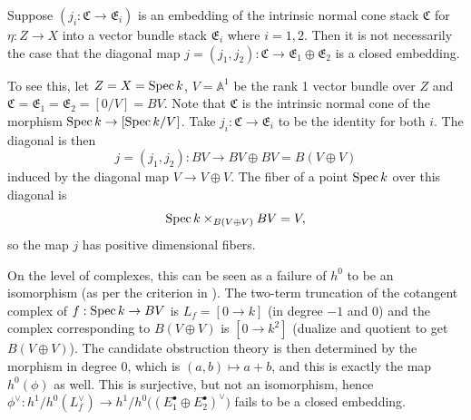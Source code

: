 \begin{example}\label{rl-0012}
  Suppose \((j_i:\mathfrak C\to \mathfrak E_i)\) is an embedding of the intrinsic normal cone stack \(\mathfrak C\) for \(\eta:Z\to X\) into a vector bundle stack \(\mathfrak E_i\) where \(i = 1,2\). Then it is not necessarily the case that the diagonal map \(j=(j_1,j_2):\mathfrak C\to \mathfrak E_1\oplus \mathfrak E_2\) is a closed embedding.

  To see this, let \(Z = X = \operatorname{Spec} k\), \(V = \mathbb A^1\) be the rank 1 vector bundle over \(Z\) and \(\mathfrak C = \mathfrak E_1 = \mathfrak E_2 = [0 / V] = BV\). Note that \(\mathfrak C\) is the intrinsic normal cone of the morphism \(\operatorname{Spec} k \to [\operatorname{Spec} k/V]\). Take \(j_i:\mathfrak C\to \mathfrak E_i\) to be the identity for both \(i\). The diagonal is then
  \[j = (j_1,j_2): BV \to BV \oplus BV = B(V\oplus V)\]
  induced by the diagonal map \(V\to V\oplus V\). The fiber of a point \(\operatorname{Spec} k\) over this diagonal is
  \[\operatorname{Spec} k\times_{B(V\oplus V)}BV = V,\]
  so the map \(j\) has positive dimensional fibers.

  On the level of complexes, this can be seen as a failure of \(h^0\) to be an isomorphism (as per the criterion in \cite[Proposition 2.6]{behrend-fantechi_IntrinsicNormalCone1997}). The two-term truncation of the cotangent complex of \(f:\operatorname{Spec} k \to BV\) is \(L_f = [0 \to k]\) (in degree \(-1\) and \(0\)) and the complex corresponding to \(B(V\oplus V)\) is \([0 \to k^2]\) (dualize and quotient to get \(B(V\oplus V)\)). The candidate obstruction theory is then determined by the morphism in degree \(0\), which is \((a,b) \mapsto a+b\), and this is exactly the map \(h^0(\phi)\) as well. This is surjective, but not an isomorphism, hence \(\phi^\vee:h^1/h^0(L_f^\vee)\to h^1/h^0\big((E_1^\bullet\oplus E_2^\bullet)^\vee\big)\) fails to be a closed embedding.
\end{example}
